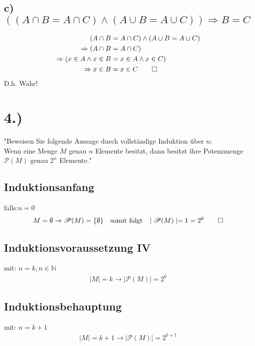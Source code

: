 \documentclass[titlepage]{article}
\begin{document}
			\subsection*{c) $((A\cap B=A\cap C)\wedge (A\cup B=A\cup C))\Rightarrow B=C$}
				\begin{align*}
					(A\cap B&=A\cap C)\wedge (A\cup B=A\cup C)\\
					\Rightarrow(A\cap B&=A\cap C)\\
					\Rightarrow(x\in A\wedge x\in B&=x\in A\wedge x\in C)\\
					\Rightarrow x\in B&=x\in C\qed
				\end{align*}
			D.h. Wahr!
		\section*{4.)}
			"Beweisen Sie folgende Aussage durch vollständige Induktion über $n$:\\
			Wenn eine Menge $M$ genau $n$ Elemente besitzt, dann besitzt ihre Potenzmenge $\mathscr{P}(M)$ genau $2^n$ Elemente."
			\subsection*{Induktionsanfang} falls:$n=0$\\
				\begin{align*}
					M=\emptyset\rightarrow\mathscr{P}(M)=\{\emptyset\}&&\text{somit folgt}&&\mid\mathscr{P}(M)\mid=1=2^0\qed
				\end{align*}
			\subsection*{Induktionsvoraussetzung IV}
			mit: $n=k,n\in\mathbb{N}$\\
				\begin{align*}
					\mid M\mid=k\rightarrow\mid\mathscr{P}(M)\mid=2^k
				\end{align*}
			\subsection*{Induktionsbehauptung}
			mit: $n=k+1$\\
				\begin{align*}
					\mid M\mid=k+1\rightarrow\mid\mathscr{P}(M)\mid=2^{k+1}
				\end{align*}
\end{document}
